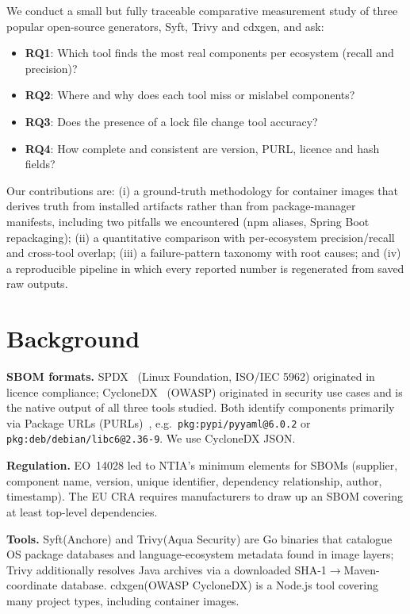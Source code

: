 \documentclass[conference]{IEEEtran}
\newcommand{\syft}{Syft\xspace}
\newcommand{\trivy}{Trivy\xspace}
\newcommand{\cdxgen}{cdxgen\xspace}
\newcommand{\RQ}[1]{\textbf{RQ#1}}
\begin{document}
We conduct a small but fully traceable comparative measurement study of three popular open-source
generators, \syft, \trivy and \cdxgen, and ask:
\begin{itemize}
\item \RQ1: Which tool finds the most real components per ecosystem (recall and precision)?
\item \RQ2: Where and why does each tool miss or mislabel components?
\item \RQ3: Does the presence of a lock file change tool accuracy?
\item \RQ4: How complete and consistent are version, PURL, licence and hash fields?
\end{itemize}
Our contributions are: (i) a ground-truth methodology for container images that derives truth from
installed artifacts rather than from package-manager manifests, including two pitfalls we encountered
(npm aliases, Spring Boot repackaging); (ii) a quantitative comparison with per-ecosystem
precision/recall and cross-tool overlap; (iii) a failure-pattern taxonomy with root causes; and (iv) a
reproducible pipeline in which every reported number is regenerated from saved raw outputs.

\section{Background}
\textbf{SBOM formats.} SPDX~\cite{spdx} (Linux Foundation, ISO/IEC 5962) originated in licence
compliance; CycloneDX~\cite{cyclonedx} (OWASP) originated in security use cases and is the native output
of all three tools studied. Both identify components primarily via Package URLs (PURLs)~\cite{purlspec},
e.g.\ \texttt{pkg:pypi/pyyaml@6.0.2} or \texttt{pkg:deb/debian/libc6@2.36-9}. We use CycloneDX JSON.

\textbf{Regulation.} EO~14028 led to NTIA's minimum elements for SBOMs (supplier, component name,
version, unique identifier, dependency relationship, author, timestamp). The EU CRA requires
manufacturers to draw up an SBOM covering at least top-level dependencies.

\textbf{Tools.} \syft (Anchore) and \trivy (Aqua Security) are Go binaries that catalogue OS package
databases and language-ecosystem metadata found in image layers; \trivy additionally resolves Java
archives via a downloaded SHA-1$\rightarrow$Maven-coordinate database. \cdxgen (OWASP CycloneDX) is a
Node.js tool covering many project types, including container images.
\end{document}
